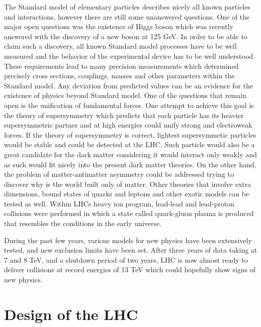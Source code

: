 The Standard model of elementary particles describes nicely all known particles and interactions, however there are still some unanswered questions. One of the major open questions was the existence of Higgs boson which was recently answered with the discovery of a new boson at 125 GeV. In order to be able to claim such a discovery, all known Standard model processes have to be well measured and the behavior of the experimental device has to be well understood. These requirements lead to many precision measurements which determined precisely cross sections, couplings, masses and other parameters within the Standard model. Any deviation from predicted values can be an evidence for the existence of physics beyond Standard model. One of the questions that remain open is the unification of fundamental forces. One attempt to achieve this goal is the theory of supersymmetry which predicts that each particle has its heavier supersymmetric partner and at high energies could unify strong and electroweak forces. If the theory of supersymmetry is correct, lightest supersymmetic particles would be stable and could be detected at the LHC. Such particle would also be a great candidate for the dark matter considering it would interact only weakly and as such would fit nicely into the present dark matter theories. On the other hand, the problem of matter-antimatter asymmetry could be addressed trying to discover why is the world built only of matter. Other theories that involve extra dimensions, bound states of quarks and leptons and other exotic models can be tested as well. Within LHCs heavy ion program, lead-lead and lead-proton collisions were performed in which a state called quark-gluon plasma is produced that resembles the conditions in the early universe. 
\par During the past few years, various models for new physics have been extensively tested, and new exclusion limits have been set. After three years of data taking at 7 and 8 TeV, and a shutdown period of two years, LHC is now almost ready to deliver collisions at record energies of 13 TeV which could hopefully show signs of new physics.        


\section{Design of the LHC}

